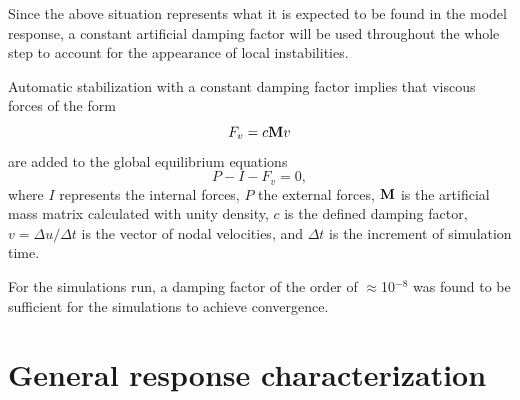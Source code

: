   Since the above situation represents what it is expected to be found in the model response, a constant artificial damping factor will be used throughout the whole step to account for the appearance of local instabilities.  

  Automatic stabilization with a constant damping factor implies that viscous forces of the form
  $$
  F_v = c \mathrm{\textbf{M}} v
  $$
  are added to the global equilibrium equations
  $$
  P - I - F_v = 0,
  $$
  where $I$ represents the internal forces, $P$ the external forces, $\mathrm{\textbf{M}}$ is the artificial mass matrix calculated with unity density, $c$ is the defined damping factor, $v = \Delta u / \Delta t$ is the vector of nodal velocities, and $\Delta t$ is the increment of simulation time.

  For the simulations run, a damping factor of the order of $\approx$10$^{-8}$ was found to be sufficient for the simulations to achieve convergence.

\section{General response characterization} \label{sec:generalResponseCharact}



